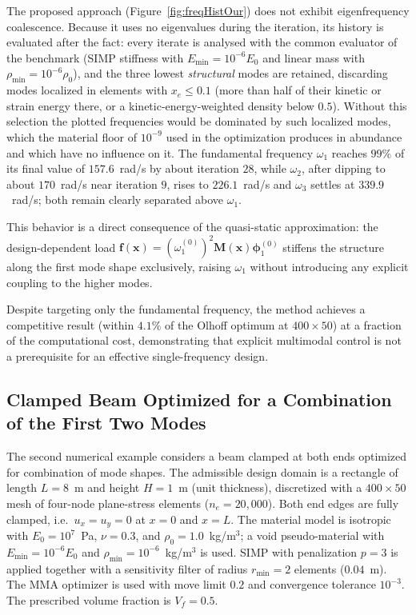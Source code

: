 \documentclass[applsci,article,submit,pdftex,moreauthors]{Definitions/mdpi}
\begin{document}
The proposed approach (Figure~\ref{fig:freqHistOur}) does not exhibit eigenfrequency coalescence. Because it uses no eigenvalues during the iteration, its history is evaluated after the fact: every iterate is analysed with the common evaluator of the benchmark (SIMP stiffness with $E_\mathrm{min} = 10^{-6}E_0$ and linear mass with $\rho_\mathrm{min} = 10^{-6}\rho_0$), and the three lowest \emph{structural} modes are retained, discarding modes localized in elements with $x_e \le 0.1$ (more than half of their kinetic or strain energy there, or a kinetic-energy-weighted density below $0.5$). Without this selection the plotted frequencies would be dominated by such localized modes, which the material floor of $10^{-9}$ used in the optimization produces in abundance and which have no influence on it. The fundamental frequency $\omega_1$ reaches $99\%$ of its final value of $157.6$~rad/s by about iteration $28$, while $\omega_2$, after dipping to about $170$~rad/s near iteration $9$, rises to $226.1$~rad/s and $\omega_3$ settles at $339.9$~rad/s; both remain clearly separated above $\omega_1$.

This behavior is a direct consequence of the quasi-static approximation: the design-dependent load $\mathbf{f}(\mathbf{x}) = (\omega_1^{(0)})^2 \mathbf{M}(\mathbf{x})\boldsymbol{\phi}_1^{(0)}$ stiffens the structure along the first mode shape exclusively, raising $\omega_1$ without introducing any explicit coupling to the higher modes.

Despite targeting only the fundamental frequency, the method achieves a competitive result (within $4.1\%$ of the Olhoff optimum at $400\times50$) at a fraction of the computational cost, demonstrating that explicit multimodal control is not a prerequisite for an effective single-frequency design.

\subsection{Clamped Beam Optimized for a Combination of the First Two Modes}\label{subsec:clampedBeam}
The second numerical example considers a beam clamped at both ends optimized for combination of mode shapes. The admissible design domain is a rectangle of length $L=8$~m and height $H=1$~m (unit thickness), discretized with a $400\times 50$ mesh of four-node plane-stress elements ($n_e=20{,}000$). Both end edges are fully clamped, i.e.\ $u_x=u_y=0$ at $x=0$ and $x=L$. The material model is isotropic with $E_0=10^7$~Pa, $\nu=0.3$, and $\rho_0=1.0$~kg/m$^3$; a void pseudo-material with $E_\mathrm{min}=10^{-6}E_0$ and $\rho_\mathrm{min}=10^{-6}$~kg/m$^3$ is used. SIMP with penalization $p=3$ is applied together with a sensitivity filter of radius $r_{\min}=2$ elements ($0.04$~m). The MMA optimizer is used with move limit $0.2$ and convergence tolerance $10^{-3}$. The prescribed volume fraction is $V_f=0.5$.
\end{document}
